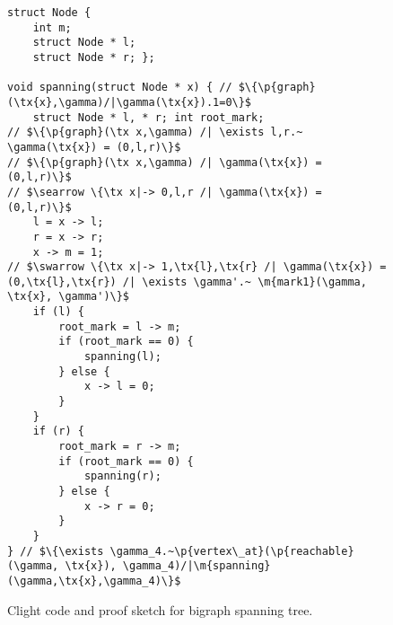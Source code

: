 \begin{figure}
  \begin{lstlisting}
struct Node {
    int m;
    struct Node * l;
    struct Node * r; };

void spanning(struct Node * x) { // $\{\p{graph}(\tx{x},\gamma)/|\gamma(\tx{x}).1=0\}$
    struct Node * l, * r; int root_mark;
// $\{\p{graph}(\tx x,\gamma) /| \exists l,r.~ \gamma(\tx{x}) = (0,l,r)\}$
// $\{\p{graph}(\tx x,\gamma) /| \gamma(\tx{x}) = (0,l,r)\}$
// $\searrow \{\tx x|-> 0,l,r /| \gamma(\tx{x}) = (0,l,r)\}$
    l = x -> l;
    r = x -> r;
    x -> m = 1;
// $\swarrow \{\tx x|-> 1,\tx{l},\tx{r} /| \gamma(\tx{x}) = (0,\tx{l},\tx{r}) /| \exists \gamma'.~ \m{mark1}(\gamma, \tx{x}, \gamma')\}$
    if (l) {
        root_mark = l -> m;
        if (root_mark == 0) {
            spanning(l);
        } else {
            x -> l = 0;
        }
    }
    if (r) {
        root_mark = r -> m;
        if (root_mark == 0) {
            spanning(r);
        } else {
            x -> r = 0;
        }
    }
} // $\{\exists \gamma_4.~\p{vertex\_at}(\p{reachable}(\gamma, \tx{x}), \gamma_4)/|\m{spanning}(\gamma,\tx{x},\gamma_4)\}$
\end{lstlisting}

\caption{Clight code and proof sketch for bigraph spanning tree.}
  
\end{figure}
